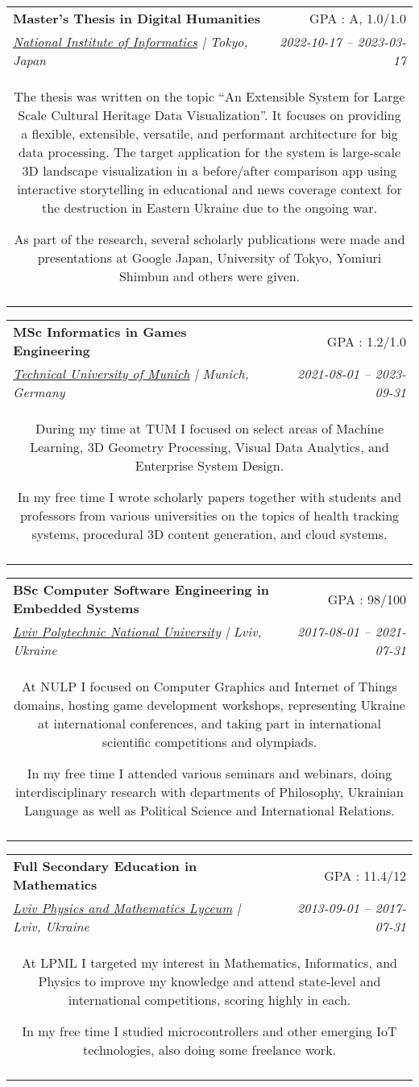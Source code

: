 \documentclass[letterpaper,10pt]{article}
\makeatletter
\newcommand{\resumeSubheading}[5]{
  \item
    \begin{tabular*}{0.97\textwidth}[t]{l@{\extracolsep{\fill}}r}
      \textbf{#1} & #2 \\
      \textit{#3} & \textit{#4} \\
      \multicolumn{2}{c}{\parbox{\linewidth}{#5}} \\\vspace{-2pt}
    \end{tabular*}\vspace{-8pt}
}
\makeatother
\begin{document}
    \resumeSubheading
      {Master's Thesis in Digital Humanities}{GPA : A, 1.0/1.0}
      {\href{https://www.nii.ac.jp/}{{National Institute of Informatics}} | Tokyo, Japan}{2022-10-17 -- 2023-03-17} 
      {The thesis was written on the topic “An Extensible System for Large Scale Cultural Heritage Data Visualization”. It focuses on providing a flexible, extensible, versatile, and performant architecture for big data processing. The target application for the system is large-scale 3D landscape visualization in a before/after comparison app using interactive storytelling in educational and news coverage context for the destruction in Eastern Ukraine due to the ongoing war.

As part of the research, several scholarly publications were made and presentations at Google Japan, University of Tokyo, Yomiuri Shimbun and others were given.}
		
    \resumeSubheading
      {MSc Informatics in Games Engineering}{GPA : 1.2/1.0}
      {\href{https://www.tum.de/}{{Technical University of Munich}} | Munich, Germany}{2021-08-01 -- 2023-09-31} 
      {During my time at TUM I focused on select areas of Machine Learning, 3D Geometry Processing, Visual Data Analytics, and Enterprise System Design.

In my free time I wrote scholarly papers together with students and professors from various universities on the topics of health tracking systems, procedural 3D content generation, and cloud systems.}
		
    \resumeSubheading
      {BSc Computer Software Engineering in Embedded Systems}{GPA : 98/100}
      {\href{https://lpnu.ua/}{{Lviv Polytechnic National University}} | Lviv, Ukraine}{2017-08-01 -- 2021-07-31} 
      {At NULP I focused on Computer Graphics and Internet of Things domains, hosting game development workshops, representing Ukraine at international conferences, and taking part in international scientific competitions and olympiads.

In my free time I attended various seminars and webinars, doing interdisciplinary research with departments of Philosophy, Ukrainian Language as well as Political Science and International Relations.}
		
    \resumeSubheading
      {Full Secondary Education in Mathematics}{GPA : 11.4/12}
      {\href{https://www.lpml.com.ua/}{{Lviv Physics and Mathematics Lyceum}} | Lviv, Ukraine}{2013-09-01 -- 2017-07-31} 
      {At LPML I targeted my interest in Mathematics, Informatics, and Physics to improve my knowledge and attend state-level and international competitions, scoring highly in each.

In my free time I studied microcontrollers and other emerging IoT technologies, also doing some freelance work.}
		
\end{document}
